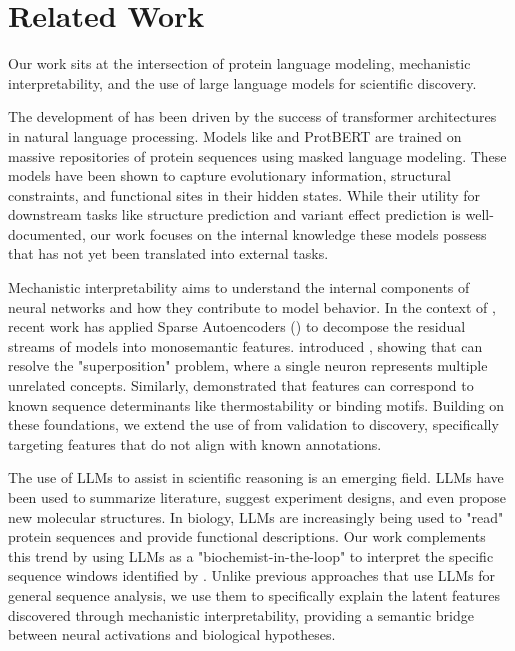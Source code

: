 \section{Related Work}
\label{sec:related_work}

Our work sits at the intersection of protein language modeling, mechanistic interpretability, and the use of large language models for scientific discovery.

The development of \plms has been driven by the success of transformer architectures in natural language processing. Models like \esm \cite{lin2022esm2} and ProtBERT are trained on massive repositories of protein sequences using masked language modeling. These models have been shown to capture evolutionary information, structural constraints, and functional sites in their hidden states. While their utility for downstream tasks like structure prediction and variant effect prediction is well-documented, our work focuses on the internal knowledge these models possess that has not yet been translated into external tasks.

Mechanistic interpretability aims to understand the internal components of neural networks and how they contribute to model behavior. In the context of \plms, recent work has applied Sparse Autoencoders (\saes) to decompose the residual streams of models into monosemantic features. \citet{simon2024interplm} introduced \interplm, showing that \saes can resolve the "superposition" problem, where a single neuron represents multiple unrelated concepts. Similarly, \citet{adams2025mechanistic} demonstrated that \sae features can correspond to known sequence determinants like thermostability or binding motifs. Building on these foundations, we extend the use of \saes from validation to discovery, specifically targeting features that do not align with known annotations.

The use of LLMs to assist in scientific reasoning is an emerging field. LLMs have been used to summarize literature, suggest experiment designs, and even propose new molecular structures. In biology, LLMs are increasingly being used to "read" protein sequences and provide functional descriptions. Our work complements this trend by using LLMs as a "biochemist-in-the-loop" to interpret the specific sequence windows identified by \saes. Unlike previous approaches that use LLMs for general sequence analysis, we use them to specifically explain the latent features discovered through mechanistic interpretability, providing a semantic bridge between neural activations and biological hypotheses.
